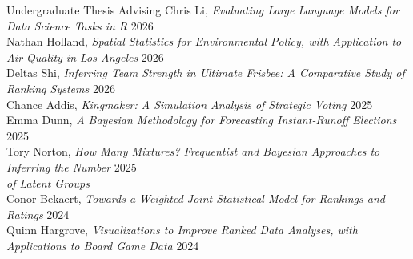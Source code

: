 \documentclass{resume} %
\begin{document}
\begin{rSection}{Undergraduate Thesis Advising}
Chris Li, \textit{Evaluating Large Language Models for Data Science Tasks in R} \hfill{2026}
\\ Nathan Holland, \textit{Spatial Statistics for Environmental Policy, with Application to Air Quality in Los Angeles} \hfill{2026}
\\ Deltas Shi, \textit{Inferring Team Strength in Ultimate Frisbee: A Comparative Study of Ranking Systems} \hfill{2026}
\\ Chance Addis, \textit{Kingmaker: A Simulation Analysis of Strategic Voting} \hfill{2025}
\\ Emma Dunn, \textit{A Bayesian Methodology for Forecasting Instant-Runoff Elections} \hfill{2025}
\\ Tory Norton, \textit{How Many Mixtures? Frequentist and Bayesian Approaches to Inferring the Number} \hfill{2025}\\ 
\hspace*{.5cm}  \textit{of Latent Groups}
\\ Conor Bekaert, \textit{Towards a Weighted Joint Statistical Model for Rankings and Ratings} \hfill{2024}
\\ Quinn Hargrove, \textit{Visualizations to Improve Ranked Data Analyses, with Applications to Board Game Data} \hfill{2024}

\end{rSection}
\end{document}
